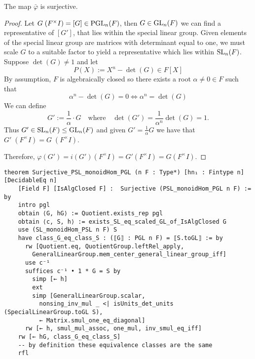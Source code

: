 \begin{lemma}
\label{Surjective_PSL_monoidHom_PGL}
\leanok
    The map $\bar{\varphi}$ is surjective.
\end{lemma}
\begin{proof}
\leanok
    Let $G \; (F^\times I) = [G] \in \operatorname{PGL}_n(F)$, then $G \in \operatorname{GL}_n(F)$ we can find a representative of $[G']$, that lies within the special linear group.
    Given elements of the special linear group are matrices with determinant equal to one, we must scale $G$ to a suitable factor to yield a representative which lies within $\operatorname{SL}_n(F)$. Suppose $\det(G) \ne 1$ and let
    \[
    P(X) := X^n - \det(G) \in F[X]
    \]
    By assumption, $F$ is algebraically closed so there exists a root $\alpha \ne 0\in F$ such that 
    \[
    \alpha^n - \det(G) = 0 \iff \alpha^n = \det(G)
    \]
    We can define
    \[
    G' := \frac{1}{\alpha} \cdot G \quad \text{where} \quad \det(G') = \frac{1}{\alpha^n} \det(G) = 1.
    \]
    Thus $G' \in \operatorname{SL}_n(F) \leq \operatorname{GL}_n(F)$ and given $G' = \frac{1}{\alpha} G$ we have that $G'  \; (F^\times I) = G \; (F^\times I)$.
    
    Therefore, $\varphi(G') = i(G') (F^\times I) = G' (F^\times I) = G (F^\times I)$.
\end{proof}
\begin{footnotesize}
\begin{verbatim}
theorem Surjective_PSL_monoidHom_PGL (n F : Type*) [hn₁ : Fintype n] [DecidableEq n]
    [Field F] [IsAlgClosed F] :  Surjective (PSL_monoidHom_PGL n F) := by
    intro pgl
    obtain ⟨G, hG⟩ := Quotient.exists_rep pgl
    obtain ⟨c, S, h⟩ := exists_SL_eq_scaled_GL_of_IsAlgClosed G
    use (SL_monoidHom_PSL n F) S
    have class_G_eq_class_S : (⟦G⟧ : PGL n F) = ⟦S.toGL⟧ := by
      rw [Quotient.eq, QuotientGroup.leftRel_apply,
        GeneralLinearGroup.mem_center_general_linear_group_iff]
      use c⁻¹
      suffices c⁻¹ • 1 * G = S by
        simp [← h]
        ext
        simp [GeneralLinearGroup.scalar,
          nonsing_inv_mul _ <| isUnits_det_units (SpecialLinearGroup.toGL S),
          ← Matrix.smul_one_eq_diagonal]
      rw [← h, smul_mul_assoc, one_mul, inv_smul_eq_iff]
    rw [← hG, class_G_eq_class_S]
    -- by definition these equivalence classes are the same
    rfl
\end{verbatim}
\end{footnotesize}

